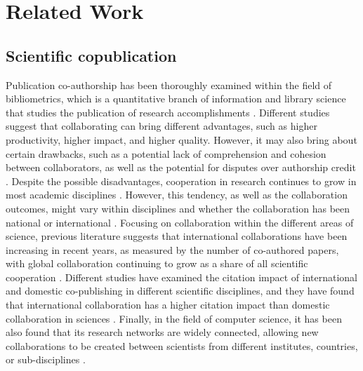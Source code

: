 \section{Related Work}
\label{sec:related_work}

\subsection{Scientific copublication}

Publication co-authorship has been thoroughly examined within the field of bibliometrics, which is a quantitative branch of information and library science that studies the publication of research accomplishments \citep{broadus1987toward}. Different studies suggest that collaborating can bring different advantages, such as higher productivity, higher impact, and higher quality. However, it may also bring about certain drawbacks, such as a potential lack of comprehension and cohesion between collaborators, as well as the potential for disputes over authorship credit \citep{besancenot2017co,franceschet2010effect,biscaro2014co}. Despite the possible disadvantages, cooperation in research continues to grow in most academic disciplines \citep{wagner2015recent,wagner2017growth,chinchilla2019follow}. However, this tendency, as well as the collaboration outcomes, might vary within disciplines and whether the collaboration has been national or international \citep{franceschet2010effect,puuska2014international}.
Focusing on collaboration within the different areas of science, previous literature suggests that international collaborations have been increasing in recent years, as measured by the number of co-authored papers, with global collaboration continuing to grow as a share of all scientific cooperation \citep{lariviere2013bibliometrics}. Different studies have examined the citation impact of international and domestic co-publishing in different scientific disciplines, and they have found that international collaboration has a higher citation impact than domestic collaboration in sciences \citep{puuska2014international,lancho2010lies,newman2004coauthorship}. Finally, in the field of computer science, it has been also found that its research networks are widely connected, allowing new collaborations to be created between scientists from different institutes, countries, or sub-disciplines \citep{franceschet2011collaboration}.

